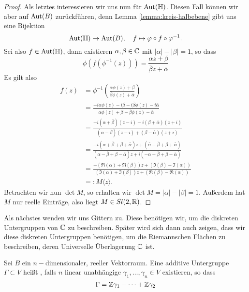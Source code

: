 \begin{proof}
  Als letztes interessieren wir uns nun für $\operatorname{Aut}(\mathbb{H})$. Diesen Fall
  können wir aber auf $\operatorname{Aut}(B)$ zurückführen, denn Lemma
  \ref{lemma:kreis-halbebene} gibt uns eine Bijektion
  \[
  \operatorname{Aut}(\mathbb{H}) \rightarrow \operatorname{Aut}(B), \quad f \mapsto \varphi \circ f \circ \varphi^{-1}.
  \]
  Sei also $f \in \operatorname{Aut}(\mathbb{H})$, dann existieren $\alpha, \beta \in \mathbb{C}$
  mit $|\alpha| - |\beta| = 1$, so dass
  \[
  \phi( f( \phi^{-1}(z))) = \frac{\alpha z + \beta}{\bar \beta z +
    \bar \alpha}
  \]
  Es gilt also
  \begin{align*}
    f(z) & = \phi^{-1} \left ( \frac{\alpha \phi(z) + \beta}{\bar
        \beta \phi(z) + \bar \alpha} \right ) \\
    & = \frac{-i \alpha \phi(z) - i \beta - i \bar \beta \phi(z) - i
      \bar \alpha}{\alpha \phi(z) + \beta - \bar \beta \phi(z) - \bar
      \alpha} \\
    & = \frac{-i (\alpha + \bar \beta)(z-i) -i (\beta + \bar
      \alpha)(z+i)}{(\alpha - \bar \beta)(z -i) + (\beta - \bar
      \alpha)(z+i)} \\
    & = \frac{-i ( \alpha + \bar \beta + \beta + \bar \alpha) z + (
      \bar \alpha - \bar \beta + \beta + \bar \alpha)}{(\alpha - \bar
      \beta + \beta - \bar \alpha)z + i (- \alpha + \bar \beta + \beta
      - \bar \alpha)} \\
    & = \frac{ - ( \Re(\alpha) + \Re(\beta)) z +  (\Im(\beta) -
      \Im(\alpha))}{(\Im(\alpha) + \Im(\beta))z + ( \Re(\beta) -
      \Re(\alpha))} \\
    & =: M\langle z \rangle.
  \end{align*}
  Betrachten wir nun $\det M$, so erhalten wir $\det M = |\alpha| -
  |\beta| = 1$. Außerdem hat $M$ nur reelle Einträge, also liegt $M
  \in Sl(2, \mathbb{R})$.
\end{proof}

Als nächstes wenden wir uns Gittern zu. Diese benötigen wir, um die
diskreten Untergruppen von $\mathbb{C}$ zu beschreiben. Später wird sich dann
auch zeigen, dass wir diese diskreten Untergruppen benötigen, um die
Riemannschen Flächen zu beschreiben, deren Universelle Überlagerung
$\mathbb{C}$ ist.

\begin{defin}
  Sei $B$ ein $n-$dimensionaler, reeller Vektorraum. Eine additive
  Untergruppe $\Gamma \subset V$ heißt , falls $n$ linear
  unabhängige $\gamma_1, \dots, \gamma_n \in V$ existieren, so dass
  \[
  \Gamma = \mathbb{Z} \gamma_1 + \dots + \mathbb{Z} \gamma_2
  \]
\end{defin}

